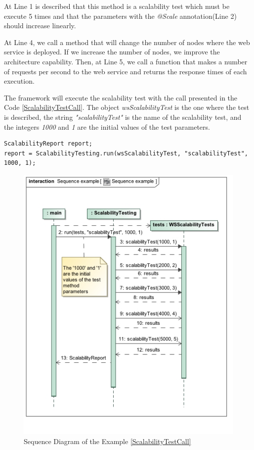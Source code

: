 At Line 1 is described that this method is a scalability test which must be execute 5 times  and that the parameters with the \emph{@Scale} annotation(Line 2) should increase linearly. 

At Line 4, we call a method that will change the number of nodes where the web service is deployed. If we increase the number of nodes, we improve the architecture capability. Then, at Line 5, we call a function that makes a number of requests per second to the web service and returns the response times of each execution.

The framework will execute the scalability test with the call presented in the Code \ref{ScalabilityTestCall}. The object \emph{wsScalabilityTest} is the one where the test is described, the string \emph{"scalabilityTest"} is the name of the scalability test, and the integers \emph{1000} and \emph{1} are the initial values of the test parameters.
\begin{lstlisting}
ScalabilityReport report;
report = ScalabilityTesting.run(wsScalabilityTest, "scalabilityTest", 1000, 1);
\end{lstlisting}


\begin{figure}[h]
\begin{center}
	\includegraphics[scale=0.7]{images/sequenceExample.jpg}
\caption{Sequence Diagram of the Example \ref{ScalabilityTestCall}}
\label{sequenceDiagramExample}
\end{center}
\end{figure}


